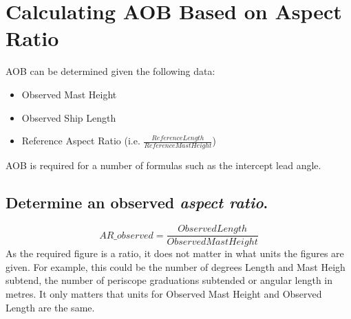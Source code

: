\documentclass{article}
\begin{document}
\clearpage




\section{Calculating AOB Based on Aspect Ratio}


AOB can be determined given the following data:
\begin{itemize}
\item{Observed Mast Height}
\item{Observed Ship Length}
\item{Reference Aspect Ratio (i.e. $\frac{Reference Length}{Reference Mast Height}$)}
\end{itemize}

AOB is required for a number of formulas such as the intercept lead angle.

\subsection{Determine an observed \emph{aspect ratio}.}
$$AR\_{observed} = \frac{Observed Length}{Observed Mast Height}$$
As the required figure is a ratio, it does not matter in what units the figures are given. For example, this could be the number of degrees Length and Mast Heigh subtend, the number of periscope graduations subtended or angular length in metres. It only matters that units for Observed Mast Height and Observed Length are the same.
\end{document}

